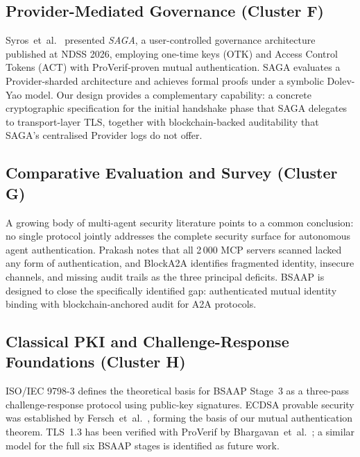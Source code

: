 \documentclass[review,5p,twocolumn,times]{elsarticle}
\begin{document}
\subsection{Provider-Mediated Governance (Cluster F)}

Syros~et~al.\ \cite{saga2026} presented \emph{SAGA}, a user-controlled
governance architecture published at NDSS 2026, employing one-time keys
(OTK) and Access Control Tokens (ACT) with ProVerif-proven mutual
authentication. SAGA evaluates a Provider-sharded architecture and achieves
formal proofs under a symbolic Dolev-Yao model.
Our design provides a complementary capability: a concrete cryptographic
specification for the initial handshake phase that SAGA delegates to
transport-layer TLS, together with blockchain-backed auditability that
SAGA's centralised Provider logs do not offer.

\subsection{Comparative Evaluation and Survey (Cluster G)}

A growing body of multi-agent security literature points to a common
conclusion: no single protocol jointly addresses the complete security
surface for autonomous agent authentication. Prakash \cite{aip2026}
notes that all 2\,000 MCP servers scanned lacked any form of authentication,
and BlockA2A \cite{blocka2a2025} identifies fragmented identity, insecure
channels, and missing audit trails as the three principal deficits. BSAAP
is designed to close the specifically identified gap: authenticated mutual
identity binding with blockchain-anchored audit for A2A protocols.

\subsection{Classical PKI and Challenge-Response Foundations (Cluster H)}

ISO/IEC 9798-3 \cite{isoiec9798} defines the theoretical basis for
BSAAP Stage~3 as a three-pass challenge-response protocol using public-key
signatures. ECDSA provable security was established by Fersch~et~al.\ 
\cite{fersch2016provable}, forming the basis of our mutual authentication
theorem. TLS~1.3 has been verified with ProVerif by Bhargavan~et~al.\ 
\cite{bhargavan2017tls13}; a similar model for the full six BSAAP stages is
identified as future work.
\end{document}
